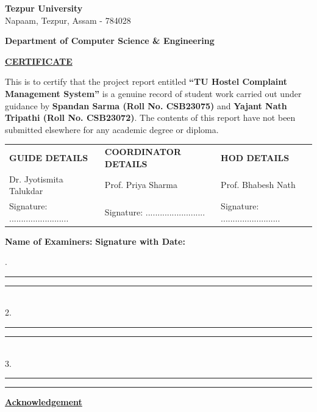 \documentclass[12pt,a4paper]{article}
\begin{document}
\newpage
\thispagestyle{plain}
\begin{center}
    \large
    \textcolor{univcolor}{\textbf{Tezpur University}} \\
    \small \textcolor{univcolor}{Napaam, Tezpur, Assam - 784028}
\end{center}

\noindent
\Large \textcolor{titlecolor}{\textbf{Department of Computer Science \& Engineering}}

\vspace{1cm}
\begin{center}
    \large
    \textbf{\underline{CERTIFICATE}}
\end{center}

\vspace{0.5cm}
\noindent
\normalsize
This is to certify that the project report entitled \textbf{``TU Hostel Complaint Management System''} is a genuine record of student work carried out under guidance by \textbf{Spandan Sarma (Roll No. CSB23075)} and \textbf{Yajant Nath Tripathi (Roll No. CSB23072)}. The contents of this report have not been submitted elsewhere for any academic degree or diploma.

\vspace{2cm}
\noindent
\begin{tabular*}{\textwidth}{@{\extracolsep{\hfill}}lll@{}}
\textbf{GUIDE DETAILS} & \textbf{COORDINATOR DETAILS} & \textbf{HOD DETAILS} \\
Dr. Jyotismita Talukdar & Prof. Priya Sharma & Prof. Bhabesh Nath \\[1.2cm]
Signature: ......................... & Signature: ......................... & Signature: .........................
\end{tabular*}

\vspace{2.5cm}
\noindent
\textbf{Name of Examiners:} \hfill \textbf{Signature with Date:}
\vspace{0.6cm}

. \rule{6.5cm}{0.4pt} \hfill \rule{6.5cm}{0.4pt} \\[0.8cm]
2. \rule{6.5cm}{0.4pt} \hfill \rule{6.5cm}{0.4pt} \\[0.8cm]
3. \rule{6.5cm}{0.4pt} \hfill \rule{6.5cm}{0.4pt}

\newpage
\begin{center}
    \Large \textbf{\underline{Acknowledgement}}
\end{center}
\end{document}
